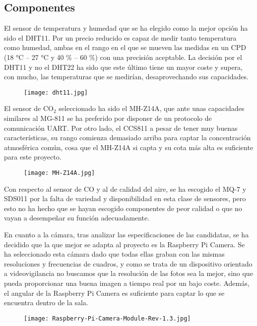 \subsection{Componentes}\label{subsec:componentes}
El sensor de temperatura y humedad que se ha elegido como la mejor opción ha sido el DHT11. Por un precio reducido es capaz de medir tanto temperatura como humedad, ambas en el rango en el que se mueven las medidas en un CPD (18 °C -- 27 °C y  40 \% -- 60 \%) con una precisión aceptable. La decisión por el DHT11 y no el DHT22 ha sido que este último tiene un mayor coste y supera, con mucho, las temperaturas que se medirían, desaprovechando sus capacidades.
\begin{figure}[H]
	{\texttt{[image: dht11.jpg]}}\label{fig:dht11}
\end{figure}
El sensor de CO$_2$ seleccionado ha sido el MH-Z14A, que ante unas capacidades similares al MG-811 se ha preferido por disponer de un protocolo de comunicación UART. Por otro lado, el CCS811 a pesar de tener muy buenas características, su rango comienza demasiado arriba para captar la concentración atmosférica común, cosa que el MH-Z14A si capta y su cota más alta es suficiente para este proyecto.
\begin{figure}[H]
	{\texttt{[image: MH-Z14A.jpg]}}\label{fig:mh-z14a}
\end{figure}
Con respecto al sensor de CO y al de calidad del aire, se ha escogido el MQ-7 y SDS011 por la falta de variedad y disponibilidad en esta clase de sensores, pero esto no ha hecho que se hayan escogido componentes de peor calidad o que no vayan a desempeñar su función adecuadamente.

En cuanto a la cámara, tras analizar las especificaciones de las candidatas, se ha decidido que la que mejor se adapta al proyecto es la Raspberry Pi Camera. Se ha seleccionado esta cámara dado que todas ellas graban con las mismas resoluciones y frecuencias de cuadros, y como se trata de un dispositivo orientado a videovigilancia no buscamos que la resolución de las fotos sea la mejor, sino que pueda proporcionar una buena imagen a tiempo real por un bajo coste. Además, el angular de la Raspberry Pi Camera es suficiente para captar lo que se encuentra dentro de la sala.
\begin{figure}[H]
	{\texttt{[image: Raspberry-Pi-Camera-Module-Rev-1.3.jpg]}}\label{fig:moduloCamara}
\end{figure}

